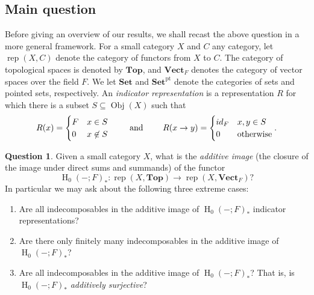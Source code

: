 \documentclass[a4paper]{amsart}
\theoremstyle{plain}
\theoremstyle{definition}
\newtheorem{question}[theorem]{Question}
\theoremstyle{remark}
\newcommand{\Top}{\mathbf{Top}}
\newcommand{\Set}{\mathbf{Set}}
\newcommand{\pSet}{\mathbf{Set}^\mathrm{pt}}
\newcommand{\VectF}{\mathbf{Vect}_F}
\DeclareMathOperator{\rep}{rep}
\begin{document}


\subsection{Main question}
Before giving an overview of our results, we shall recast the above question in a more general framework. For a small category $X$ and $C$ any category, let $\rep(X, C)$ denote the category of functors from $X$ to $C$. The category of topological spaces is denoted by $\Top$, and $\VectF$ denotes the category of vector spaces over the field $F$. We let $\Set$ and $\pSet$ denote the categories of sets and pointed sets, respectively. An \emph{indicator representation} is a representation \( R \) for which there is a subset \( S \subseteq \operatorname{Obj}(X) \) such that
\[ R(x) = \begin{cases} F & x \in S \\ 0 & x \not\in S \end{cases}\qquad  \text{ and }\qquad  R(x \to y) = \begin{cases} {\rm id}_F & x,y \in S \\ 0 & \text{otherwise} \end{cases}. \]

\begin{question} \label{questions}
Given a small category $X$, what is the \emph{additive image} (the closure of the image under direct sums and summands) of the functor
\[ \operatorname{H}_0(-;F)_* \colon \rep(X, \Top) \to \rep(X, \VectF)? \]
In particular we may ask about the following three extreme cases:
\begin{enumerate}
\item Are all indecomposables in the additive image of \( \operatorname{H}_0(-;F)_* \) indicator representations?
\item Are there only finitely many indecomposables in the additive image of \( \operatorname{H}_0(-;F)_* \)?
\item Are all indecomposables in the additive image of \( \operatorname{H}_0(-;F)_* \)? That is, is \( \operatorname{H}_0(-;F)_* \) \emph{additively surjective}?
\end{enumerate}

\end{question}
\end{document}
